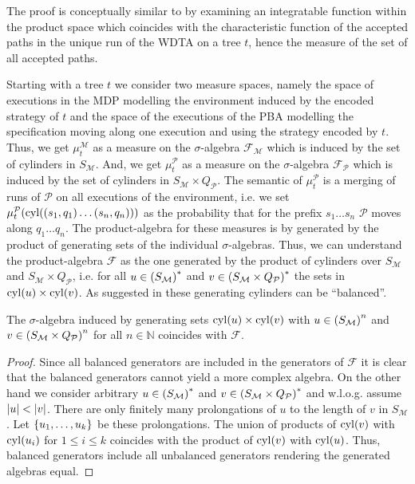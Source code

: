 The proof is conceptually similar to \cite[Proposition 43]{RandAutoInfTrees} by
examining an integratable function within the product space which coincides
with the characteristic function of the accepted paths in the unique run of
the \ac{WDTA} on a tree $t$, hence the measure of the set of all accepted
paths.

Starting with a tree $t$ we consider two measure spaces, namely the space of
executions in the \ac{MDP} modelling the environment induced by the encoded
strategy of $t$ and the space of the executions of the \ac{PBA} modelling the
specification moving along one execution and using the strategy encoded by $t$.
Thus, we get $\mu^{\mathcal{M}}_{t}$ as a measure on the $\sigma$-algebra
$\mathcal{F}_{\mathcal{M}}$ which is induced by the set of cylinders in
$S_{\mathcal{M}}$. And, we get $\mu^{\mathcal{P}}_{t}$ as a measure on the
$\sigma$-algebra $\mathcal{F}_{\mathcal{P}}$ which is induced
by the set of cylinders in $S_{\mathcal{M}}\times Q_{\mathcal{P}}$. The
semantic of $\mu^{\mathcal{P}}_{t}$ is a merging of runs of
$\mathcal{P}$ on all executions of the environment, i.e. we set
$\mu^{\mathcal{P}}_{t}(\operatorname{cyl}(\left(s_{1}, q_{1}\right)\dots\left(s_{n}, q_{n}\right)))$
as the probability that for the prefix $s_{1}\dots s_{n}$ $\mathcal{P}$
moves along $q_{1}\dots q_{n}$. The product-algebra for these measures is
by \cite[Theorem 22.1]{Bauer} generated by the product of generating sets of
the individual $\sigma$-algebras. Thus, we can understand the product-algebra
$\mathcal{F}$ as the one generated by the product of cylinders over
$S_{\mathcal{M}}$ and $S_{\mathcal{M}}\times Q_{\mathcal{P}}$, i.e. for all
$u\in \left(S_{\mathcal{M}}\right)^{*}$ and
$v\in \left(S_{\mathcal{M}}\times Q_{\mathcal{P}}\right)^{*}$ the sets in
$\operatorname{cyl}(u)\times\operatorname{cyl}(v)$. As suggested in \cite[Remark 35]{RandAutoInfTrees}
these generating cylinders can be \enquote{balanced}.
\begin{lemma}
  The $\sigma$-algebra induced by generating sets $\operatorname{cyl}(u)\times\operatorname{cyl}(v)$ with
  $u\in \left(S_{\mathcal{M}}\right)^{n}$ and
  $v\in \left(S_{\mathcal{M}}\times Q_{\mathcal{P}}\right)^{n}$ for all
  $n\in\mathbb{N}$ coincides with $\mathcal{F}$.
\end{lemma}
\begin{proof}
  Since all balanced generators are included in the generators of $\mathcal{F}$
  it is clear that the balanced generators cannot yield a more complex algebra.
  On the other hand we consider arbitrary $u\in \left(S_{\mathcal{M}}\right)^{*}$
  and $v\in \left(S_{\mathcal{M}}\times Q_{\mathcal{P}}\right)^{*}$ and w.l.o.g.
  assume $\left\vert{u}\right\vert<\left\vert{v}\right\vert$. There are only finitely many prolongations of $u$
  to the length of $v$ in $S_{\mathcal{M}}$. Let $\left\{u_{1},\dots,u_{k}\right\}$ be
  these prolongations. The union of products of $\operatorname{cyl}(v)$ with $\operatorname{cyl}(u_{i})$
  for $1\leq i\leq k$ coincides with the product of $\operatorname{cyl}(v)$ with $\operatorname{cyl}(u)$.
  Thus, balanced generators include all unbalanced generators rendering the
  generated algebras equal.
\end{proof}
